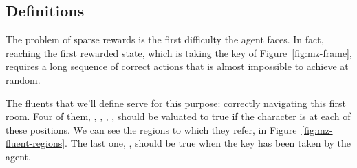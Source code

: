 \subsection{Definitions}

The problem of sparse rewards is the first difficulty the agent faces. In
fact, reaching the first rewarded state, which is taking the key of
Figure~\ref{fig:mz-frame}, requires a long sequence of correct actions that is
almost impossible to achieve at random.

The fluents that we'll define serve for this purpose: correctly navigating
this first room. Four of them, , ,
, , should be valuated to true if the
character is at each of these positions. We can see the regions to which they
refer, in Figure~\ref{fig:mz-fluent-regions}. The last one, ,
should be true when the key has been taken by the agent.


